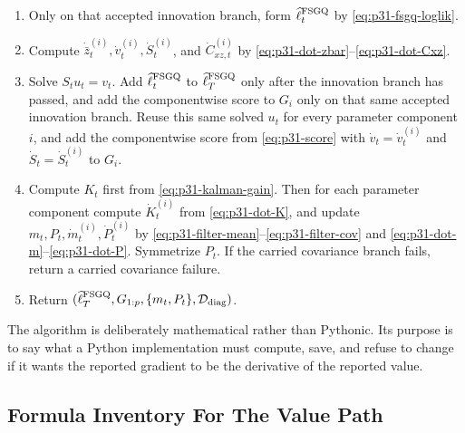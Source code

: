 \documentclass[11pt]{article}
\numberwithin{equation}{section}
\newcommand{\ellhat}{\widehat\ell}
\begin{document}
{\begin{minipage}{0.94\linewidth}
\begin{enumerate}[leftmargin=0.22in]
covariance failure.
\item Only on that accepted innovation branch, form
\(\ellhat_t^{\rm FSGQ}\) by \eqref{eq:p31-fsgq-loglik}.
\item Compute \(\dot{\bar z}_t^{(i)},\dot v_t^{(i)},\dot S_t^{(i)}\), and
\(\dot C_{xz,t}^{(i)}\) by \eqref{eq:p31-dot-zbar}--\eqref{eq:p31-dot-Cxz}.
\item Solve \(S_tu_t=v_t\).  Add \(\ellhat_t^{\rm FSGQ}\) to
\(\ellhat_T^{\rm FSGQ}\) only after the innovation branch has passed, and add
the componentwise score to \(G_i\) only on that same accepted innovation
branch.  Reuse this same solved \(u_t\) for every parameter component \(i\),
and add the componentwise score from \eqref{eq:p31-score} with
\(\dot v_t=\dot v_t^{(i)}\) and \(\dot S_t=\dot S_t^{(i)}\) to
\(G_i\).
\item Compute \(K_t\) first from \eqref{eq:p31-kalman-gain}.  Then for each
parameter component compute \(\dot K_t^{(i)}\) from \eqref{eq:p31-dot-K},
and update \(m_t,P_t,\dot m_t^{(i)},\dot P_t^{(i)}\) by
\eqref{eq:p31-filter-mean}--\eqref{eq:p31-filter-cov} and
\eqref{eq:p31-dot-m}--\eqref{eq:p31-dot-P}.  Symmetrize \(P_t\).  If the
carried covariance branch fails, return a carried covariance failure.
\item Return \((\ellhat_T^{\rm FSGQ},G_{1:p},\{m_t,P_t\},\mathcal D_{\rm diag})\).
\end{enumerate}
\end{minipage}}

The algorithm is deliberately mathematical rather than Pythonic.  Its purpose
is to say what a Python implementation must compute, save, and refuse to
change if it wants the reported gradient to be the derivative of the reported
value.

\subsection{Formula Inventory For The Value Path}
\label{subsec:p32-value-inventory}
\end{document}
